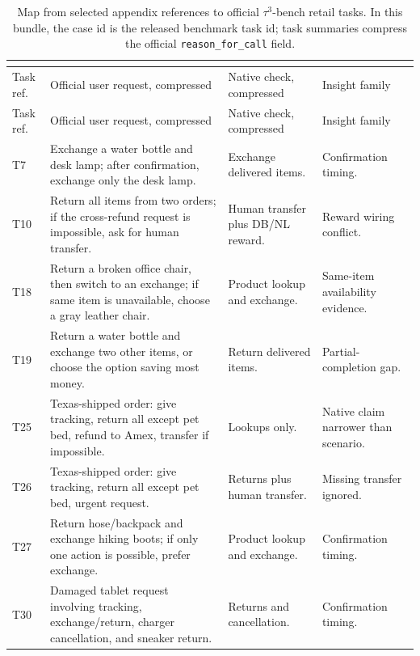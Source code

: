 
\begingroup
\scriptsize
\setlength{\tabcolsep}{2.2pt}
\renewcommand{\arraystretch}{1.15}
\begin{longtable}{@{}p{}p{}p{}p{}@{}}
\caption{Map from selected appendix references to official \(\tau^3\)-bench retail tasks. In this bundle, the case id is the released benchmark task id; task summaries compress the official \texttt{reason\_for\_call} field.}\\
\label{tab:tau3-task-map}\\
\toprule
Task ref. & Official user request, compressed & Native check, compressed & Insight family \\
\midrule
\endfirsthead
\toprule
Task ref. & Official user request, compressed & Native check, compressed & Insight family \\
\midrule
\endhead
T7 & Exchange a water bottle and desk lamp; after confirmation, exchange only the desk lamp. & Exchange delivered items. & Confirmation timing. \\
T10 & Return all items from two orders; if the cross-refund request is impossible, ask for human transfer. & Human transfer plus DB/NL reward. & Reward wiring conflict. \\
T18 & Return a broken office chair, then switch to an exchange; if same item is unavailable, choose a gray leather chair. & Product lookup and exchange. & Same-item availability evidence. \\
T19 & Return a water bottle and exchange two other items, or choose the option saving most money. & Return delivered items. & Partial-completion gap. \\
T25 & Texas-shipped order: give tracking, return all except pet bed, refund to Amex, transfer if impossible. & Lookups only. & Native claim narrower than scenario. \\
T26 & Texas-shipped order: give tracking, return all except pet bed, urgent request. & Returns plus human transfer. & Missing transfer ignored. \\
T27 & Return hose/backpack and exchange hiking boots; if only one action is possible, prefer exchange. & Product lookup and exchange. & Confirmation timing. \\
T30 & Damaged tablet request involving tracking, exchange/return, charger cancellation, and sneaker return. & Returns and cancellation. & Confirmation timing. \\

\end{longtable}

